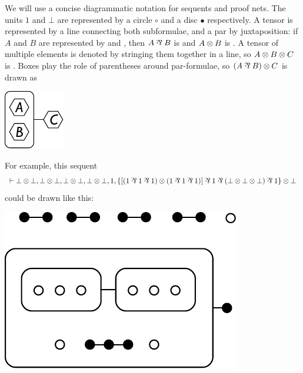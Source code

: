 \documentclass[conference]{IEEEtran}
\begin{document}
We will use a concise diagrammatic notation for sequents and proof nets.
%
The units $1$ and $\bot$ are represented by a circle $\circ$ and a disc $\bullet$ respectively.
%
A tensor is represented by a line connecting both subformulae, and a par by juxtaposition: if $A$ and $B$ are represented by 
and ,
%
then $A\parr B$ is 
and $A\otimes B$ is .
%
A tensor of multiple elements is denoted by stringing them together in a line, so $A\otimes B\otimes C$ is
.
%
Boxes play the role of parentheses around par-formulae, so $(A\parr B)\tn C$ is drawn as \begin{center}{\includegraphics[scale=1]{hex-AparBtnC.pdf}}\end{center}

\noindent For example, this sequent
\[ \vdash \bot\tn\bot, \bot\tn\bot, \bot\tn\bot, \bot\tn\bot, 1, \{[(1\parr 1\parr 1)\tn(1\parr 1\parr 1)]\parr 1\parr (\bot\tn\bot\tn\bot)\parr 1\}\tn\bot \]
could be drawn like this:
\begin{center}\includegraphics[scale=0.75]{example-sequent.pdf}\end{center}
\end{document}
